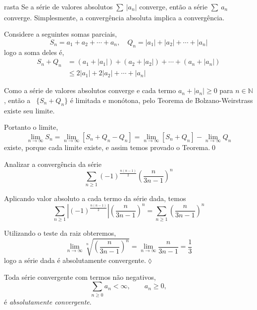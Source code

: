 \begin{theoc}{}{rasta}
Se a s\'{e}rie de valores absolutos $\sum_{}\,|a_n|$
converge, ent\~{a}o a s\'{e}rie $\sum_{}\,a_{n}$ converge.
Simplesmente, a converg\^{e}ncia absoluta implica a converg\^{e}ncia.
\end{theoc}

\prova Considere a seguintes somas parciais,
\begin{equation*}
    S_n=a_1+a_2+\cdots+a_n,\quad Q_n=|a_1|+|a_2|+\cdots+|a_n|
\end{equation*}
logo a soma deles \'{e},
\begin{align*}
    S_n+Q_n&=(a_1+|a_1|)+(a_2+|a_2|)+\cdots+(a_n+|a_n|)\\[2ex]
    &\le 2|a_1|+2|a_2|+\cdots+|a_n|
\end{align*}

Como a s\'{e}rie de valores absolutos converge e cada termo
$a_n+|a_n|\ge 0$ para $n\in \mathbb{N}$, ent\~{a}o a \seq\ $\{S_n+Q_n\}$
\'{e} limitada e mon\'{o}tona, pelo Teorema de Bolzano-Weirstrass existe seu
limite.

Portanto o limite,
\begin{equation*}
    \lim_{n\to\infty}S_n=\lim_{n\to\infty}[S_n+Q_n-Q_n]
    =\lim_{n\to\infty}[S_n+Q_n]-\lim_{n\to\infty}Q_n
\end{equation*}
existe, porque cada limite existe, e assim temos provado o
Teorema.\qed

\begin{exer}
Analizar a converg\^{e}ncia da s\'{e}rie
\begin{equation*}
    \sum_{n\geq 1}(-1)^{\frac{n(n-1)}{2}}\left( \frac{n}{3n-1}\right)^n
\end{equation*}
\end{exer}

\sol Aplicando valor absoluto a cada termo da s\'{e}rie dada, temos
\begin{equation*}
    \sum_{n\geq 1}\left|(-1)^{\frac{n(n-1)}{2}}\right|\left(
    \frac{n}{3n-1}\right)^n=\sum_{n\geq 1}\left( \frac{n}{3n-1}\right)^n
\end{equation*}

Utilizando o teste da raiz obteremos,
\begin{equation*}
\lim_{n\to \infty}\sqrt[n]{\left(
\frac{n}{3n-1}\right)^n}=\lim_{n\to
\infty}\frac{n}{3n-1}=\frac{1}{3}
\end{equation*}
logo a s\'{e}rie dada \'{e} absolutamente convergente.\hfill \(\lozenge\)

\begin{coro}
Toda s\'{e}rie \textsf{convergente} com termos n\~{a}o negativos,
\begin{equation*}
    \sum_{n\ge 0}a_n<\infty,\qquad a_n\ge 0,
\end{equation*}
\'{e} \textit{absolutamente convergente}.
\end{coro}

